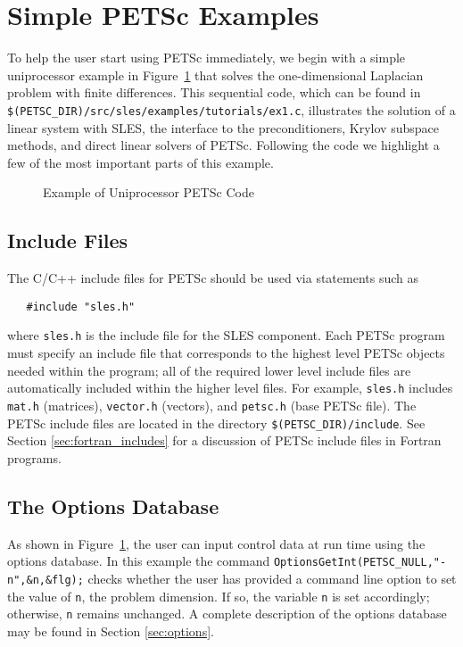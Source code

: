 \section{Simple PETSc Examples}

\label{sec:simple}

To help the user start using PETSc immediately, we begin with a simple
uniprocessor example in Figure~\ref{fig:example1} that solves the
one-dimensional Laplacian problem with finite differences.  This
sequential code, which can be found in 
{\tt \$(PETSC\_DIR)/src/sles/examples/tutorials/ex1.c},
illustrates the solution of a linear system with SLES, the 
interface to the preconditioners, Krylov subspace methods, and direct
linear solvers of PETSc.  Following the code we highlight a few of the most important
parts of this example.  

\begin{figure}[H]
{\footnotesize
{}
}
\caption{Example of Uniprocessor PETSc Code}
\label{fig:example1}
\end{figure}

\subsection*{Include Files}

The C/C++ include files for PETSc should be used via statements such as
\begin{verbatim}
   #include "sles.h"
\end{verbatim}
where {\tt sles.h} is the include file for the SLES component.
Each PETSc program must specify an
include file that corresponds to the highest level PETSc objects
needed within the program; all of the required lower level include
files are automatically included within the higher level files.  For
example, {\tt sles.h} includes {\tt mat.h} (matrices),
{\tt vector.h} (vectors), and {\tt petsc.h} (base PETSc file).  
The PETSc include files are located in the directory 
{\tt \$(PETSC\_DIR)/include}.  See Section \ref{sec:fortran_includes}
for a discussion of PETSc include files in Fortran programs.

\subsection*{The Options Database}

As shown in Figure~\ref{fig:example1}, the user can input control data
at run time using the options database. In this example the command
{\tt OptionsGetInt(PETSC\_NULL,"-n",\&n,\&flg);} checks whether the user has
provided a command line option to set the value of {\tt n}, the
problem dimension.  If so, the variable {\tt n} is set accordingly;
otherwise, {\tt n} remains unchanged. A complete description of the
options database may be found in Section \ref{sec:options}.

